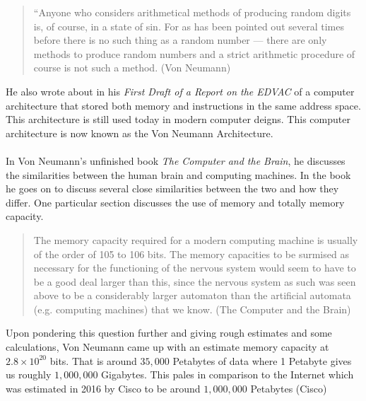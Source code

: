 \documentclass[12pt]{article}
\begin{document}
\begin{quotation}
	``Anyone who considers arithmetical methods of producing random digits is, of course, in a state of sin. For as has been pointed out several times before there is no such thing as a random number --- there are only methods to produce random numbers and a strict arithmetic procedure of course is not such a method. (Von Neumann)
\end{quotation}

He also wrote about in his \textit{First Draft of a Report on the EDVAC} of a computer architecture that stored both memory and instructions in the same address space. This architecture is still used today in modern computer deigns. This computer architecture is now known as the Von Neumann Architecture.\\
\\
In Von Neumann's unfinished book \textit{The Computer and the Brain}, he discusses the similarities between the human brain and computing machines. In the book he goes on to discuss several close similarities between the two and how they differ. One particular section discusses the use of memory and totally memory capacity.
\begin{quotation}
	The memory capacity required for a modern computing machine is usually of the order of 105 to 106 bits. The memory capacities to be surmised as necessary for the functioning of the nervous system would seem to have to be a good deal larger than this, since the nervous system as such was seen above to be a considerably larger automaton than the artificial automata (e.g. computing machines)	that we know. (The Computer and the Brain)
\end{quotation}
	Upon pondering this question further and giving rough estimates and some calculations, Von Neumann came up with an estimate memory capacity at $ 2.8 \times 10^{20} $ bits. That is around $ 35,000 $ Petabytes of data where 1 Petabyte gives us roughly $ 1,000,000 $ Gigabytes. This pales in comparison to the Internet which was estimated in 2016 by Cisco to be around $ 1,000,000 $ Petabytes (Cisco)
\end{document}
